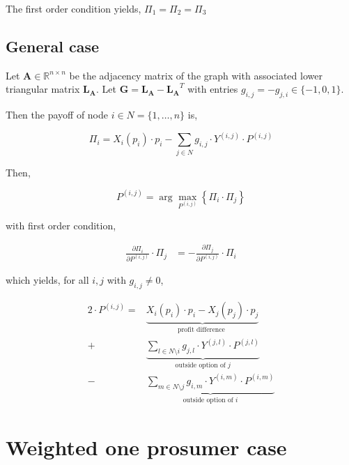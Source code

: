 \documentclass[american]{scrartcl}
\newcommand{\R}{\mathbb{R}}
\newcommand{\matr}[1]{\bm{#1}}
\begin{document}
The first order condition yields, $\Pi_1 = \Pi_2 = \Pi_3$

\subsection{General case}

Let $\matr{A} \in \R^{n\times n}$ be the adjacency matrix of the graph with associated lower triangular matrix $\matr{L_A}$. Let $\matr{G} = \matr{L_A} - \matr{L_A}^T$ with entries $g_{i, j} = -g_{j, i} \in \{-1, 0, 1\}$.

Then the payoff of node $i \in N = \{1, \ldots, n\}$ is,

\begin{equation}
	\Pi_i = X_i(p_i)\cdot p_i - \sum_{j \in N} g_{i, j} \cdot Y^{(i, j)} \cdot P^{(i, j)}
\end{equation}

Then,

\begin{equation}
	P^{(i, j)} = \arg \max_{P^{(i, j)}} \left\{\Pi_i \cdot \Pi_j \right\}
\end{equation}

with first order condition,

\begin{equation}
	\begin{split}
		\frac{\partial\Pi_i}{\partial P^{(i, j)}} \cdot \Pi_j &= - \frac{\partial\Pi_j}{\partial P^{(i, j)}} \cdot \Pi_i
	\end{split}
\end{equation}

which yields, for all $i, j$ with $ g_{i, j} \neq 0$,

\begin{equation}
	\begin{split}
		2\cdot P^{(i, j)} = & \underbrace{X_i(p_i)\cdot p_i - X_j(p_j)\cdot p_j}_{\text{profit difference }}
		\\  + &\underbrace{\sum_{l\in N\setminus i} g_{j, l} \cdot Y^{(j, l)} \cdot P^{(j, l)}}_{\text{outside option of } j}
		\\ - & \underbrace{\sum_{m \in N\setminus j} g_{i, m} \cdot Y^{(i, m)} \cdot P^{(i, m)}}_{\text{outside option of } i}
	\end{split}
\end{equation}

\iffalse %

	\section{Weighted one prosumer case}
\end{document}
